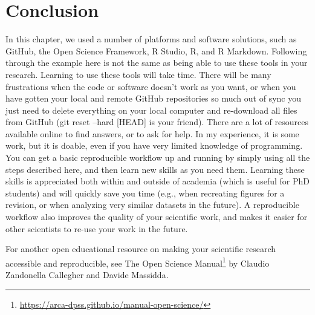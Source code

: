 \documentclass[
  oneside]{krantz}
\renewcommand{\href}[2]{#2\footnote{\url{#1}}}
\begin{document}
\hypertarget{conclusion-1}{%
\section{Conclusion}\label{conclusion-1}}

In this chapter, we used a number of platforms and software solutions, such as GitHub, the Open Science Framework, R Studio, R, and R Markdown. Following through the example here is not the same as being able to use these tools in your research. Learning to use these tools will take time. There will be many frustrations when the code or software doesn't work as you want, or when you have gotten your local and remote GitHub repositories so much out of sync you just need to delete everything on your local computer and re-download all files from GitHub (git reset --hard {[}HEAD{]} is your friend). There are a lot of resources available online to find answers, or to ask for help. In my experience, it is some work, but it is doable, even if you have very limited knowledge of programming. You can get a basic reproducible workflow up and running by simply using all the steps described here, and then learn new skills as you need them. Learning these skills is appreciated both within and outside of academia (which is useful for PhD students) and will quickly save you time (e.g., when recreating figures for a revision, or when analyzing very similar datasets in the future). A reproducible workflow also improves the quality of your scientific work, and makes it easier for other scientists to re-use your work in the future.

For another open educational resource on making your scientific research accessible and reproducible, see \href{https://arca-dpss.github.io/manual-open-science/}{The Open Science Manual} by Claudio Zandonella Callegher and Davide Massidda.

  

\backmatter
\printindex
\end{document}
